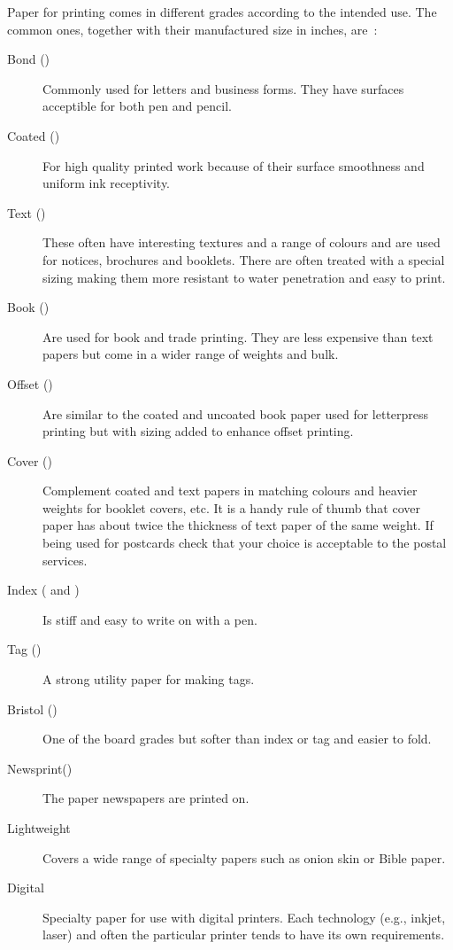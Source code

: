\documentclass[10pt,a4paper,oneside,extrafontsizes]{memoir}%
\begin{document}
\begin{paracol}{2}
    Paper for printing comes in different grades according to the intended 
use. The common ones, together with their manufactured size in inches, 
are~\autocite{POCKETPAL}:
\begin{description}
\item[Bond ()] Commonly used for letters and
business forms. They have surfaces acceptible for both pen and pencil.

\item[Coated ()] For high quality printed
work because of their surface smoothness and uniform ink receptivity.

\item[Text ()] These often have interesting 
textures and a range of colours and are used for notices, brochures and 
booklets. There are often treated with a special sizing making them more
resistant to water penetration and easy to print.

\item[Book ()] Are used for book and trade 
printing. They are less expensive than text papers but come in a wider range
of weights and bulk.

\item[Offset ()] Are similar to the coated and
uncoated book paper used for letterpress printing but with sizing added to
enhance offset printing.

\item[Cover ()] Complement coated and text
papers in matching colours and heavier weights for booklet covers, etc. It is
a handy rule of thumb that cover paper has about twice the thickness of text
paper of the same weight. If being used for postcards check that your choice 
is acceptable to the postal services.

\item[Index ( and )] Is 
stiff and easy to write on with a pen.

\item[Tag  ()] A strong utility paper for making
tags.

\item[Bristol ()] One of the board grades
but softer than index or tag and easier to fold.

\item[Newsprint()] The paper newspapers 
are printed on.

\item[Lightweight] Covers a wide range of
specialty papers such as onion skin or Bible paper.

\item[Digital] Specialty paper for use with
digital printers. Each technology (e.g., inkjet, laser) and often 
the particular printer tends to have its own requirements.
\end{description}
\end{paracol}
\end{document}
